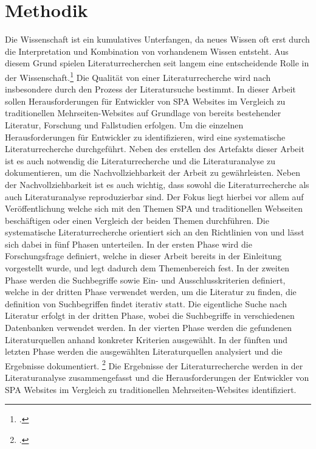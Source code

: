 \section{Methodik}
Die Wissenschaft ist ein kumulatives Unterfangen, da neues Wissen oft erst durch die Interpretation und Kombination von vorhandenem Wissen entsteht. 
Aus diesem Grund spielen Literaturrecherchen seit langem eine entscheidende Rolle in der Wissenschaft.\footcite[Vgl.][S. 1]{conf/ecis/BrockeSNRPC09}
Die Qualität von einer Literaturrecherche wird nach \citeauthor{conf/ecis/BrockeSNRPC09} insbesondere durch den Prozess der Literatursuche bestimmt.
In dieser Arbeit sollen Herausforderungen für Entwickler von \ac{SPA} Websites im Vergleich zu traditionellen Mehrseiten-Websites auf Grundlage von bereits bestehender Literatur, Forschung und Fallstudien erfolgen.
Um die einzelnen Herausforderungen für Entwickler zu identifizieren, wird eine systematische Literaturrecherche durchgeführt.
Neben des erstellen des Artefakts dieser Arbeit ist es auch notwendig die Literaturrecherche und die Literaturanalyse zu dokumentieren, um die Nachvollziehbarkeit der Arbeit zu gewährleisten.
Neben der Nachvollziehbarkeit ist es auch wichtig, dass sowohl die Literaturrecherche als auch Literaturanalyse reproduzierbar sind. 
Der Fokus liegt hierbei vor allem auf Veröffentlichung welche sich mit den Themen \ac{SPA} und traditionellen Webseiten beschäftigen oder einen Vergleich der beiden Themen durchführen.
Die systematische Literaturrecherche orientiert sich an den Richtlinien von \citeauthor{conf/ecis/BrockeSNRPC09} und lässt sich dabei in fünf Phasen unterteilen.
In der ersten Phase wird die Forschungsfrage definiert, welche in dieser Arbeit bereits in der Einleitung vorgestellt wurde, und legt dadurch dem Themenbereich fest.
In der zweiten Phase werden die Suchbegriffe sowie Ein- und Ausschlusskriterien definiert, welche in der dritten Phase verwendet werden, um die Literatur zu finden, die definition von Suchbegriffen findet iterativ statt.
Die eigentliche Suche nach Literatur erfolgt in der dritten Phase, wobei die Suchbegriffe in verschiedenen Datenbanken verwendet werden.
In der vierten Phase werden die gefundenen Literaturquellen anhand konkreter Kriterien ausgewählt.
In der fünften und letzten Phase werden die ausgewählten Literaturquellen analysiert und die Ergebnisse dokumentiert. \footcite[Vgl.][S. 2]{conf/ecis/BrockeSNRPC09}
Die Ergebnisse der Literaturrecherche werden in der Literaturanalyse zusammengefasst und die Herausforderungen  der Entwickler von \ac{SPA} Websites im Vergleich zu traditionellen Mehrseiten-Websites identifiziert.

